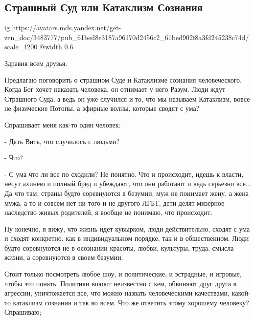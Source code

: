  
 
 
 
 
\subsection{Страшный Суд или Катаклизм Сознания}
\label{sec:20_12_2021.yz.vestnik.1.kataklizm_soznania}

\begin{center}
\ifcmt
  ig https://avatars.mds.yandex.net/get-zen_doc/3483777/pub_61bed8e3187a96170d2456c2_61bed902f8a3fd245238c74d/scale_1200
  @width 0.6
\fi

\end{center}

Здравия всем друзья.

Предлагаю поговорить о страшном Суде и Катаклизме сознания человеческого. Когда
Бог хочет наказать человека, он отнимает у него Разум. Люди ждут Страшного
Суда, а ведь он уже случился и то, что мы называем Катаклизм, вовсе не
физические Потопы, а эфирные волны, которые сводят с ума?

Спрашивает меня как-то один человек:

- Дять Вить, что случилось с людьми?

- Что?

- С ума что ли все по сходили? Не понятно. Что и происходит, идешь к власти,
несут ахинею и полный бред и убеждают, что они работают и ведь серьезно все… Да
что там, страны будто соревнуются в безумии, муж не понимает жену, а жена мужа,
а то и совсем нет ни того и не другого ЛГБТ, дети делят мизерное наследство
живых родителей, я вообще не понимаю, что происходит.

Ну конечно, я вижу, что жизнь идет кувырком, люди действительно, сходят с ума и
сходят конкретно, как в индивидуальном порядке, так и в общественном. Люди
будто соревнуются не в осознании красоты, любви, культуры, труда, смысла жизни,
а соревнуются в своем безумии.

Стоит только посмотреть любое шоу, и политические, и эстрадные, и игровые,
чтобы это понять. Политики воюют неизвестно с кем, обвиняют друг друга в
агрессии, уничтожается все, что можно назвать человеческими качествами,
какой-то катаклизм сознания и так во всем. Что же ответить этому хорошему
человеку? Спрашиваю;

